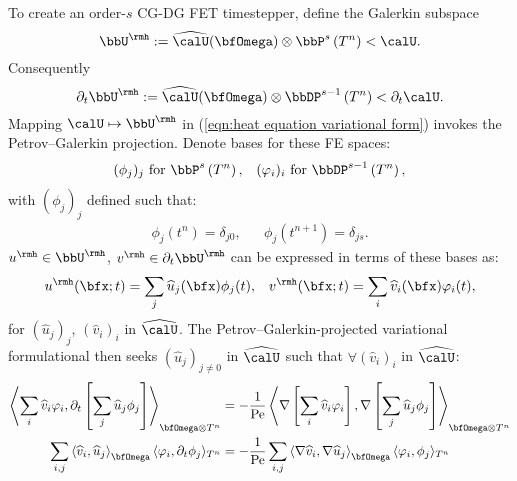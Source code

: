 \begin{example}
        To create an order-$s$ CG-DG FET timestepper, define the Galerkin subspace
        \begin{equation}
            \bbU^{\rmh}  :=  \widehat{\calU}(\bfOmega)\otimes\bbP^{s}\left(T^{n}\right)  <  \calU.
        \end{equation}
        Consequently
        \begin{equation}
            \partial_{t}\bbU^{\rmh}  :=  \widehat{\calU}(\bfOmega)\otimes\bbDP^{s - 1}\left(T^{n}\right)  <  \partial_{t}\calU.
        \end{equation}
        Mapping $\calU  \mapsto  \bbU^{\rmh}$ in (\ref{eqn:heat equation variational form}) invokes the Petrov--Galerkin projection. Denote bases for these FE spaces:
        \begin{align}
            (\phi_{j})_{j}     \text{ for }  \bbP^{s}\left(T^{n}\right),         &&
            (\varphi_{i})_{i}  \text{ for }  \bbDP^{s - 1}\left(T^{n}\right),
        \end{align}
        with $(\phi_{j})_{j}$ defined such that:
        \begin{align}
            \phi_{j}\left(t^{n}\right)      =  \delta_{j0},  &&
            \phi_{j}\left(t^{n + 1}\right)  =  \delta_{js}.
        \end{align}
        $u^{\rmh}  \in  \bbU^{\rmh}$, $v^{\rmh}  \in  \partial_{t}\bbU^{\rmh}$ can be expressed in terms of these bases as:
        \begin{align}
            u^{\rmh}(\bfx; t)  =  \sum_{j}\widehat{u}_{j}(\bfx)\phi_{j}(t),  &&
            v^{\rmh}(\bfx; t)  =  \sum_{i}\widehat{v}_{i}(\bfx)\varphi_{i}(t),
        \end{align}
        for $\left(\widehat{u}_{j}\right)_{j}$, $\left(\widehat{v}_{i}\right)_{i}$ in $\widehat{\calU}$. The Petrov--Galerkin-projected variational formulational then seeks $\left(\widehat{u}_{j}\right)_{j \neq 0}$ in $\widehat{\calU}$ such that $\forall  \left(\widehat{v}_{i}\right)_{i}$ in $\widehat{\calU}$:
        \begin{align}
            \left\langle\sum_{i}\widehat{v}_{i}\varphi_{i}, \partial_{t}\left[\sum_{j}\widehat{u}_{j}\phi_{j}\right]\right\rangle_{\bfOmega\otimes T^{n}}  &=  - \frac{1}{\rmPe}\left\langle\nabla\left[\sum_{i}\widehat{v}_{i}\varphi_{i}\right], \nabla\left[\sum_{j}\widehat{u}_{j}\phi_{j}\right]\right\rangle_{\bfOmega\otimes T^{n}}  \\
            \sum_{i, j}\left\langle\widehat{v}_{i}, \widehat{u}_{j}\right\rangle_{\bfOmega}\langle\varphi_{i}, \partial_{t}\phi_{j}\rangle_{T^{n}}  &=  - \frac{1}{\rmPe}\sum_{i, j}\left\langle\nabla\widehat{v}_{i}, \nabla\widehat{u}_{j}\right\rangle_{\bfOmega}\langle\varphi_{i}, \phi_{j}\rangle_{T^{n}}

\end{align}
\end{example}

